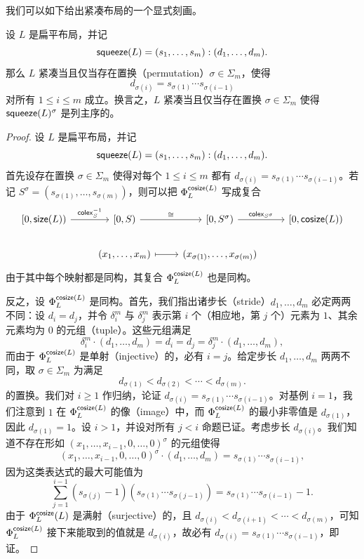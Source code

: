 我们可以如下给出紧凑布局的一个显式刻画。

\begin{proposition}\label{compactisomorphismproposition}
    设 $L$ 是扁平布局，并记
    \[
    \mathsf{squeeze}(L) = (s_1,\dots,s_m):(d_1,\dots,d_m).
    \]
    那么 $L$ 紧凑当且仅当存在置换（permutation）$\sigma \in \Sigma_m$，使得
    \[
    d_{\sigma(i)} = s_{\sigma(1)}\cdots s_{\sigma(i-1)}
    \]
    对所有 $1 \leq i \leq m$ 成立。换言之，$L$ 紧凑当且仅当存在置换 $\sigma \in \Sigma_m$ 使得 $\mathsf{squeeze}(L)^\sigma$ 是列主序的。
\end{proposition}


\begin{proof}
    设 $L$ 是扁平布局，并记
    \[
    \mathsf{squeeze}(L) = (s_1,\dots,s_m):(d_1,\dots,d_m).
    \]
    首先设存在置换 $\sigma \in \Sigma_m$ 使得对每个 $1 \leq i \leq m$ 都有 $d_{\sigma(i)} = s_{\sigma(1)} \cdots s_{\sigma(i-1)}$。若记 $S^\sigma = (s_{\sigma(1)},\dots,s_{\sigma(m)})$，则可以把 $\Phi_L^{\mathsf{cosize}(L)}$ 写成复合
    \[ \begin{tikzcd} [column sep = 12]
    {[}0,\size(L){)} \ar[rr,"\colex_S^{-1}"] & & {[}0,S{)} \ar[rr,"\cong"] & & {[}0,S^\sigma{)}\ar[rr,"\colex_{S^\sigma}"] & & {[}0,\cosize(L){)}\\
    & & (x_1,\dots,x_m) \ar[rr,mapsto] & & (x_{\sigma(1)},\dots,x_{\sigma(m)})
    \end{tikzcd} \]
    由于其中每个映射都是同构，其复合 $\Phi_L^{\mathsf{cosize}(L)}$ 也是同构。

    反之，设 $\Phi_L^{\mathsf{cosize}(L)}$ 是同构。首先，我们指出诸步长（stride）$d_1,\dots,d_m$ 必定两两不同：设 $d_i = d_j$，并令 $\delta_i^m$ 与 $\delta_j^m$ 表示第 $i$ 个（相应地，第 $j$ 个）元素为 $1$、其余元素均为 $0$ 的元组（tuple）。这些元组满足
    \[
    \delta_i^m \cdot (d_1,\dots,d_m) = d_i = d_j = \delta_j^m \cdot (d_1,\dots,d_m),
    \]
    而由于 $\Phi_L^{\mathsf{cosize}(L)}$ 是单射（injective）的，必有 $i=j$。给定步长 $d_1,\dots,d_m$ 两两不同，取 $\sigma \in \Sigma_m$ 为满足
    \[d_{\sigma(1)} < d_{\sigma(2)} < \cdots < d_{\sigma(m)}.\]
    的置换。我们对 $i \geq 1$ 作归纳，论证 $d_{\sigma(i)} = s_{\sigma(1)} \cdots s_{\sigma(i-1)}$。对基例 $i=1$，我们注意到 $1$ 在 $\Phi_L^{\mathsf{cosize}(L)}$ 的像（image）中，而 $\Phi_L^{\mathsf{cosize}(L)}$ 的最小非零值是 $d_{\sigma(1)}$，因此 $d_{\sigma(1)} = 1$。设 $i>1$，并设对所有 $j < i$ 命题已证。考虑步长 $d_{\sigma(i)}$。我们知道不存在形如 $(x_1,\dots,x_{i-1},0,\dots,0)^\sigma$ 的元组使得
    \[(x_1,\dots,x_{i-1},0,\dots,0)^\sigma \cdot (d_1,\dots,d_m) = s_{\sigma(1)}\cdots s_{\sigma(i-1)},\] 因为这类表达式的最大可能值为
    \[
    \sum_{j = 1}^{i-1} (s_{\sigma(j)}-1)(s_{\sigma(1)}\cdots s_{\sigma(j-1)}) = s_{\sigma(1)} \cdots s_{\sigma(i-1)} - 1.
    \]
    由于 $\Phi_L^{\mathsf{cosize}}(L)$ 是满射（surjective）的，且 $d_{\sigma(i)} <  d_{\sigma(i+1)} <  \cdots <  d_{\sigma(m)}$，可知 $\Phi_L^{\mathsf{cosize}(L)}$ 接下来能取到的值就是 $d_{\sigma(i)}$，故必有 $d_{\sigma(i)} = s_{\sigma(1)}\cdots s_{\sigma(i-1)}$，即证。
\end{proof}

